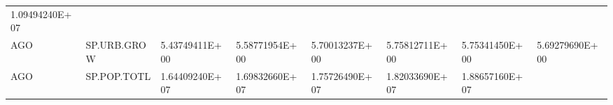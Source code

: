 \documentclass[]{article}
\begin{document}
\begin{longtable}[]{@{}llllllll@{}}
\begin{minipage}[t]{0.11\columnwidth}
1.09494240E+07\strut
\end{minipage}\tabularnewline
\begin{minipage}[t]{0.06\columnwidth}\raggedright
AGO\strut
\end{minipage} & \begin{minipage}[t]{0.08\columnwidth}\raggedright
SP.URB.GROW\strut
\end{minipage} & \begin{minipage}[t]{0.11\columnwidth}\raggedright
5.43749411E+00\strut
\end{minipage} & \begin{minipage}[t]{0.11\columnwidth}\raggedright
5.58771954E+00\strut
\end{minipage} & \begin{minipage}[t]{0.11\columnwidth}\raggedright
5.70013237E+00\strut
\end{minipage} & \begin{minipage}[t]{0.11\columnwidth}\raggedright
5.75812711E+00\strut
\end{minipage} & \begin{minipage}[t]{0.11\columnwidth}\raggedright
5.75341450E+00\strut
\end{minipage} & \begin{minipage}[t]{0.11\columnwidth}\raggedright
5.69279690E+00\strut
\end{minipage}\tabularnewline
\begin{minipage}[t]{0.06\columnwidth}\raggedright
AGO\strut
\end{minipage} & \begin{minipage}[t]{0.08\columnwidth}\raggedright
SP.POP.TOTL\strut
\end{minipage} & \begin{minipage}[t]{0.11\columnwidth}\raggedright
1.64409240E+07\strut
\end{minipage} & \begin{minipage}[t]{0.11\columnwidth}\raggedright
1.69832660E+07\strut
\end{minipage} & \begin{minipage}[t]{0.11\columnwidth}\raggedright
1.75726490E+07\strut
\end{minipage} & \begin{minipage}[t]{0.11\columnwidth}\raggedright
1.82033690E+07\strut
\end{minipage} & \begin{minipage}[t]{0.11\columnwidth}\raggedright
1.88657160E+07\strut
\end{minipage} & \begin{minipage}[t]{0.11\columnwidth}\raggedright

\end{minipage}
\end{longtable}
\end{document}
